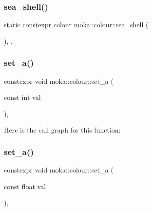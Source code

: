 \mbox{\label{classmoka_1_1colour_ac9af1ded3280cef53f9e2c709865b9a5}} 
\subsubsection{\texorpdfstring{sea\_shell()}{sea\_shell()}}
{\footnotesize\ttfamily static constexpr \mbox{\hyperlink{classmoka_1_1colour}{colour}} moka\+::colour\+::sea\+\_\+shell (\begin{DoxyParamCaption}{ }\end{DoxyParamCaption})\hspace{0.3cm}{\ttfamily [inline]}, {\ttfamily [static]}, {\ttfamily [noexcept]}}

\mbox{\label{classmoka_1_1colour_a700d904dd083ebbbc73b1aee6645d58c}} 
\subsubsection{\texorpdfstring{set\_a()}{set\_a()}\hspace{0.1cm}{\footnotesize\ttfamily [1/2]}}
{\footnotesize\ttfamily constexpr void moka\+::colour\+::set\+\_\+a (\begin{DoxyParamCaption}\item[{const int}]{val }\end{DoxyParamCaption})\hspace{0.3cm}{\ttfamily [inline]}, {\ttfamily [noexcept]}}

Here is the call graph for this function\+:
\mbox{\label{classmoka_1_1colour_ac4ff9c1b4848a555ec4e6c6d471a2209}} 
\subsubsection{\texorpdfstring{set\_a()}{set\_a()}\hspace{0.1cm}{\footnotesize\ttfamily [2/2]}}
{\footnotesize\ttfamily constexpr void moka\+::colour\+::set\+\_\+a (\begin{DoxyParamCaption}\item[{const float}]{val }\end{DoxyParamCaption})\hspace{0.3cm}{\ttfamily [inline]}, {\ttfamily [noexcept]}}

